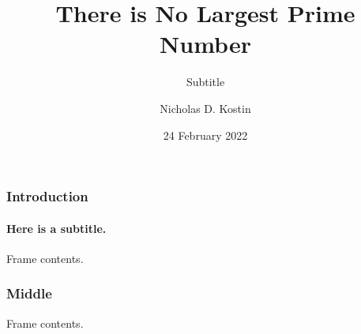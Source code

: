 \documentclass{beamer}
\title{There is No Largest Prime Number}
\subtitle{Subtitle}
\author{Nicholas D. Kostin}
\date{24 February 2022}
\begin{document}
\frame{\titlepage}

\begin{frame}
    \frametitle{Introduction}
    \framesubtitle{Here is a subtitle.}
    Frame contents.
\end{frame}

\begin{frame}
    \frametitle{Middle}
    Frame contents.
\end{frame}
\end{document}
